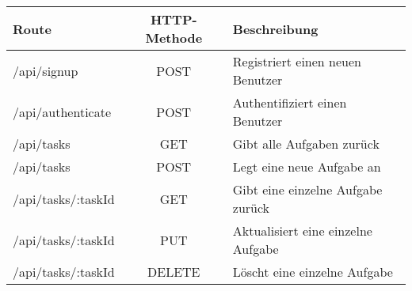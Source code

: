 \begin{center}
\begin{tabular}[c]{l | c | l }
    \textbf{Route} & \textbf{HTTP-Methode} & \textbf{Beschreibung} \\
    \hline\hline
    /api/signup & POST & Registriert einen neuen Benutzer \\
    /api/authenticate & POST & Authentifiziert einen Benutzer \\
    \hline
    /api/tasks & GET & Gibt alle Aufgaben zurück \\
    /api/tasks & POST & Legt eine neue Aufgabe an \\
    /api/tasks/:taskId & GET & Gibt eine einzelne Aufgabe zurück \\
    /api/tasks/:taskId & PUT & Aktualisiert eine einzelne Aufgabe \\
    /api/tasks/:taskId & DELETE & Löscht eine einzelne Aufgabe \\
\end{tabular}
\end{center}
